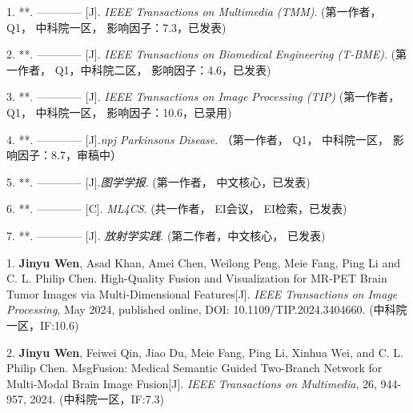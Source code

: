 \begin{publications}{99}
\ifphd
{}
\else
{}
\fi

\item[1.]
**. ------------ [J]. \textit{IEEE Transactions on Multimedia (TMM)}.  (第一作者， Q1， 中科院一区， 影响因子：7.3，已发表)

\item[2.]
**. ------------ [J]. \textit{IEEE Transactions on Biomedical Engineering (T-BME)}.  (第一作者， Q1，中科院二区， 影响因子：4.6，已发表)

\item[3.]
**. ------------ [J]. \textit{IEEE Transactions on Image Processing (TIP)} (第一作者， Q1， 中科院一区， 影响因子：10.6，已录用)

\item[4.]
**. ------------ [J].\textit{npj Parkinsons Disease}. （第一作者， Q1， 中科院一区， 影响因子：8.7，审稿中）

\item[5.]
**. ------------ [J].\textit{图学学报}. (第一作者， 中文核心，已发表)

\item[6.]
**. ------------ [C]. \textit{ML4CS}.  (共一作者， EI会议， EI检索，已发表)


\item[7.]
**. ------------ [J]. \textit{放射学实践}. (第二作者，中文核心， 已发表)

\fi



\item[1.]
\textbf{Jinyu Wen}, Asad Khan, Amei Chen, Weilong Peng, Meie Fang, Ping Li and C. L. Philip Chen. High-Quality Fusion and Visualization for MR-PET Brain Tumor Images via Multi-Dimensional Features[J]. \textit{IEEE Transactions on Image Processing}, May 2024, published online, DOI: 10.1109/TIP.2024.3404660. (中科院一区，IF:10.6)

\item[2.]
\textbf{Jinyu Wen}, Feiwei Qin, Jiao Du, Meie Fang, Ping Li, Xinhua Wei, and C. L. Philip Chen. MsgFusion: Medical Semantic Guided Two-Branch Network for Multi-Modal Brain Image Fusion[J]. \textit{IEEE Transactions on Multimedia}, 26, 944-957, 2024.  (中科院一区，IF:7.3)


\end{publications}
